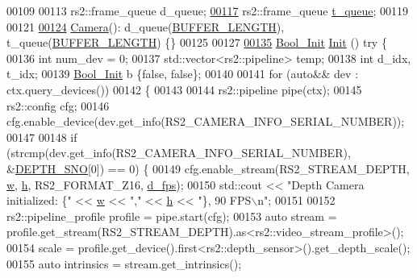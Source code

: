 \begin{DoxyCode}
00109 
00113     rs2::frame\_queue d\_queue;
\hypertarget{Camera_8hpp_source.tex_l00117}{}\hyperlink{classCamera_ad8a4c52c0ae125ab8ca66902408f5e95}{00117}     rs2::frame\_queue \hyperlink{classCamera_ad8a4c52c0ae125ab8ca66902408f5e95}{t\_queue};
00119 
00121 
\hypertarget{Camera_8hpp_source.tex_l00124}{}\hyperlink{classCamera_a01f94c3543f56ede7af49dc778f19331}{00124}     \hyperlink{classCamera_a01f94c3543f56ede7af49dc778f19331}{Camera}(): d\_queue(\hyperlink{Camera_8hpp_af7b7dc9a200cb1404c280bd500fd1551}{BUFFER\_LENGTH}), t\_queue(\hyperlink{Camera_8hpp_af7b7dc9a200cb1404c280bd500fd1551}{BUFFER\_LENGTH}) \{\}
00125 
00127 
\hypertarget{Camera_8hpp_source.tex_l00135}{}\hyperlink{classCamera_a7f09b843d9b3a97e78eefcebbc53e054}{00135}     \hyperlink{structBool__Init}{Bool\_Init} \hyperlink{classCamera_a7f09b843d9b3a97e78eefcebbc53e054}{Init} () \textcolor{keyword}{try} \{
00136         \textcolor{keywordtype}{int} num\_dev = 0;
00137         std::vector<rs2::pipeline> temp;
00138         \textcolor{keywordtype}{int} d\_idx, t\_idx;
00139         \hyperlink{structBool__Init}{Bool\_Init} b \{\textcolor{keyword}{false}, \textcolor{keyword}{false}\};
00140 
00141         \textcolor{keywordflow}{for} (\textcolor{keyword}{auto}&& dev : ctx.query\_devices())
00142         \{
00143 
00144             rs2::pipeline pipe(ctx);
00145             rs2::config cfg;
00146             cfg.enable\_device(dev.get\_info(RS2\_CAMERA\_INFO\_SERIAL\_NUMBER));
00147             
00148             \textcolor{keywordflow}{if} (strcmp(dev.get\_info(RS2\_CAMERA\_INFO\_SERIAL\_NUMBER), &\hyperlink{Camera_8hpp_a08da237113fcf4a0fb79c89a2ba02bce}{DEPTH\_SNO}[0]) == 0) \{
00149                 cfg.enable\_stream(RS2\_STREAM\_DEPTH, \hyperlink{Camera_8hpp_a66326676d44c838441a4dc39c85f599b}{w}, \hyperlink{Camera_8hpp_a3f40fea9b1040e381f08ddd4b026765d}{h}, RS2\_FORMAT\_Z16, 
      \hyperlink{Camera_8hpp_ad56e71b7cc91ce32f920769b6eb31e03}{d\_fps});
00150                 std::cout << \textcolor{stringliteral}{"Depth Camera initialized: \{"} << \hyperlink{Camera_8hpp_a66326676d44c838441a4dc39c85f599b}{w} << \textcolor{stringliteral}{","} << \hyperlink{Camera_8hpp_a3f40fea9b1040e381f08ddd4b026765d}{h} << \textcolor{stringliteral}{"\}, 90 FPS\(\backslash\)n"};
00151 
00152                 rs2::pipeline\_profile profile = pipe.start(cfg);
00153                 \textcolor{keyword}{auto} stream = profile.get\_stream(RS2\_STREAM\_DEPTH).as<rs2::video\_stream\_profile>();
00154                 scale = profile.get\_device().first<rs2::depth\_sensor>().get\_depth\_scale();
00155                 \textcolor{keyword}{auto} intrinsics = stream.get\_intrinsics();

\end{DoxyCode}
